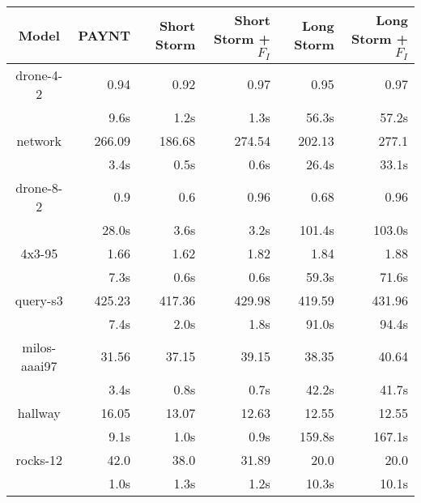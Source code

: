 \begin{table}
\begin{tabular}{|c|r|r|r|r|r|}
\hline

Model & PAYNT & Short Storm & Short Storm + $F_{I}$ & Long Storm & Long Storm + $F_{I}$ \\ \hline 

drone-4-2 & 0.94 & 0.92 & 0.97 & 0.95 & 0.97 \\ 
 & 9.6s & 1.2s & 1.3s & 56.3s & 57.2s \\ 
\hline
network & 266.09 & 186.68 & 274.54 & 202.13 & 277.1 \\ 
 & 3.4s & 0.5s & 0.6s & 26.4s & 33.1s \\ 
\hline
drone-8-2 & 0.9 & 0.6 & 0.96 & 0.68 & 0.96 \\ 
 & 28.0s & 3.6s & 3.2s & 101.4s & 103.0s \\ 
\hline
4x3-95 & 1.66 & 1.62 & 1.82 & 1.84 & 1.88 \\ 
 & 7.3s & 0.6s & 0.6s & 59.3s & 71.6s \\ 
\hline
query-s3 & 425.23 & 417.36 & 429.98 & 419.59 & 431.96 \\ 
 & 7.4s & 2.0s & 1.8s & 91.0s & 94.4s \\ 
\hline
milos-aaai97 & 31.56 & 37.15 & 39.15 & 38.35 & 40.64 \\ 
 & 3.4s & 0.8s & 0.7s & 42.2s & 41.7s \\ 
\hline
hallway & 16.05 & 13.07 & 12.63 & 12.55 & 12.55 \\ 
 & 9.1s & 1.0s & 0.9s & 159.8s & 167.1s \\ 
\hline
rocks-12 & 42.0 & 38.0 & 31.89 & 20.0 & 20.0 \\ 
 & 1.0s & 1.3s & 1.2s & 10.3s & 10.1s \\ 
\hline

\end{tabular}
\end{table}

